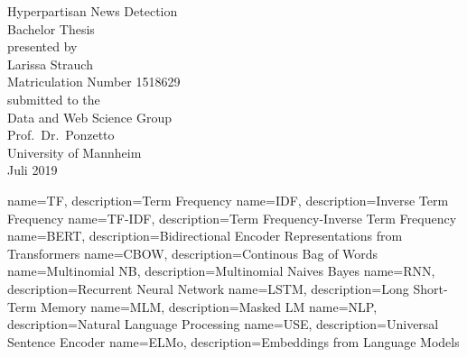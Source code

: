 \documentclass[a4paper, 11pt,titlepage,oneside,openany]{book}
\begin{document}
\begin{titlepage}
	\vspace*{2cm}
  \begin{center}
   {\Large Hyperpartisan News Detection\\}
   \vspace{2cm} 
   {Bachelor Thesis\\}
   \vspace{2cm}
   {presented by\\
    Larissa Strauch \\
    Matriculation Number 1518629\\
   }
   \vspace{1cm} 
   {submitted to the\\
    Data and Web Science Group\\
    Prof.\ Dr.\ Ponzetto\\
    University of Mannheim\\} \vspace{2cm}
   {Juli 2019}
  \end{center}
\end{titlepage} 

\tableofcontents
\newpage

\listofalgorithms
\listoffigures

\listoftables

{
	name=TF,
	description={Term Frequency}
}
{
	name=IDF,
	description={Inverse Term Frequency}
}
{
	name=TF-IDF,
	description={Term Frequency-Inverse Term Frequency}
}
{
	name=BERT,
	description={Bidirectional Encoder Representations from Transformers}
}
{
	name=CBOW,
	description={Continous Bag of Words}
}
{
	name=Multinomial NB,
	description={Multinomial Naives Bayes}
}
{
	name=RNN,
	description={Recurrent Neural Network}
}
{
	name=LSTM,
	description={Long Short-Term Memory}
}
{
	name=MLM,
	description={Masked LM}
}
{
	name=NLP,
	description={Natural Language Processing}
}
{
	name=USE,
	description={Universal Sentence Encoder}
}
{
	name=ELMo,
	description={Embeddings from Language Models}
}
\printglossaries %
\end{document}
